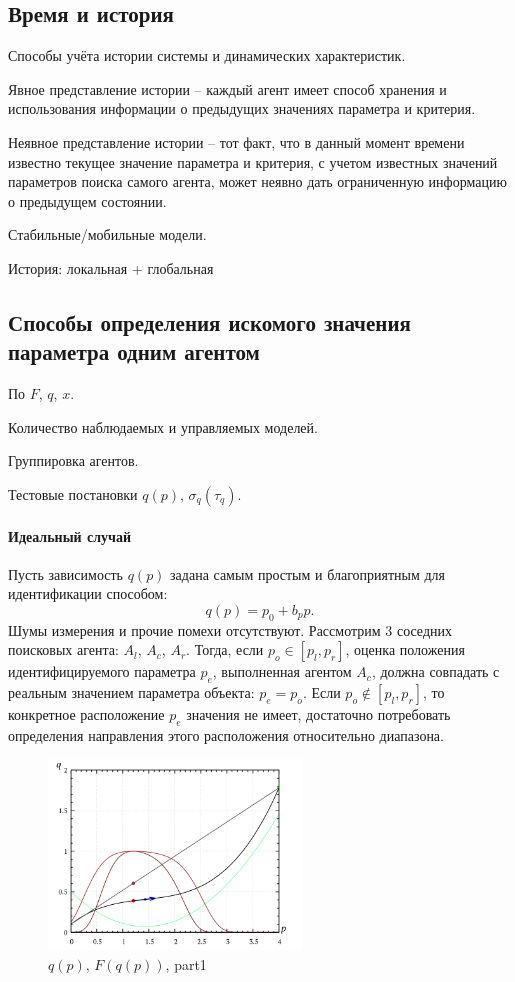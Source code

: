 \subsection{Время и история}  %

Способы учёта истории системы и динамических характеристик.

Явное представление истории -- каждый агент имеет способ хранения и использования
информации о предыдущих значениях параметра и критерия.

Неявное представление истории -- тот факт, что в данный момент времени известно
текущее значение параметра и критерия, с учетом известных значений
параметров поиска самого агента, может неявно дать ограниченную информацию
о предыдущем состоянии.

Стабильные/мобильные модели.

История: локальная + глобальная



\subsection{ Способы определения искомого значения параметра одним агентом }  %

По $F$, $q$, $x$.

Количество наблюдаемых и управляемых моделей.

Группировка агентов.

Тестовые постановки $q(p)$, $\sigma_q(\tau_q)$.

\paragraph{Идеальный случай}

Пусть зависимость $q(p)$ задана самым простым и благоприятным для идентификации способом:
%
\[
  q(p) = p_0 + b_p p .
\]
Шумы измерения и прочие помехи отсутствуют.
Рассмотрим 3 соседних поисковых агента: $A_l$, $A_c$, $A_r$.
Тогда, если $p_o \in [ p_l, p_r ] $, оценка положения
идентифицируемого параметра $p_e$, выполненная агентом $A_c$,
должна совпадать с реальным значением параметра объекта: $p_e = p_o $.
Если $p_o \notin [ p_l, p_r ] $, то конкретное расположение
$p_e$ значения не имеет, достаточно потребовать определения направления
этого расположения относительно диапазона. %


\begin{figure}[htb!]
  \centerline{\includegraphics[width=0.6\textwidth]{pq_1x2.png} }
  \caption{ $q(p)$, $F(q(p))$, part1 }
  \label{atu:pq_1x2}
\end{figure}

